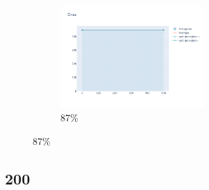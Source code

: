 \documentclass[12pt, fleqn]{report}                             %
\theoremstyle{break}                                            %
\begin{document}
\begin{figure}[ht!]
\begin{subfigure}[b]{0.4\linewidth}
          \includegraphics[width=0.6\textwidth]{Images/184/dia-d.png}
          \caption{87\%}
        \end{subfigure}
      \end{figure}


      \clearpage
      \subsection{200}
\end{document}
